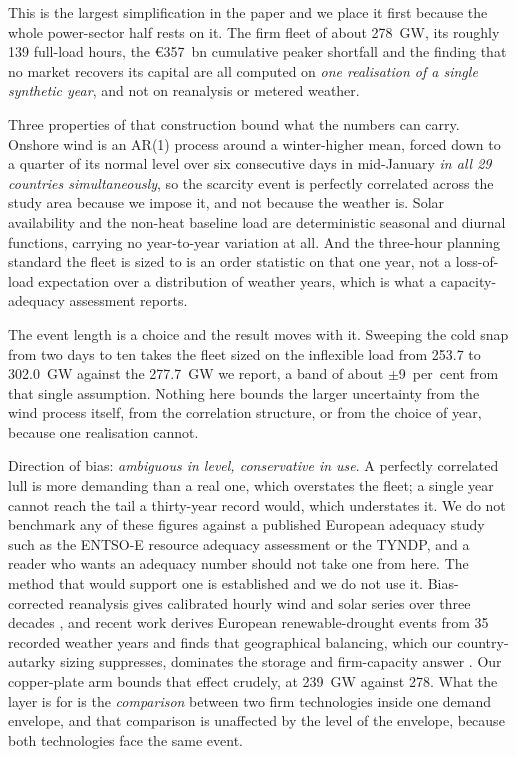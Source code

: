 This is the largest simplification in the paper and we place it first because the whole
power-sector half rests on it. The firm fleet of about 278~GW, its roughly 139 full-load
hours, the \euro{}357~bn cumulative peaker shortfall and the finding that no market
recovers its capital are all computed on \emph{one realisation of a single synthetic
year}, and not on reanalysis or metered weather.

Three properties of that construction bound what the numbers can carry. Onshore wind is an
AR(1) process around a winter-higher mean, forced down to a quarter of its normal level
over six consecutive days in mid-January \emph{in all 29 countries simultaneously}, so the
scarcity event is perfectly correlated across the study area because we impose it, and not
because the weather is. Solar availability and the non-heat baseline load are deterministic
seasonal and diurnal functions, carrying no year-to-year variation at all. And the
three-hour planning standard the fleet is sized to is an order statistic on that one
year, not a loss-of-load expectation over a distribution of weather years, which is what a
capacity-adequacy assessment reports.

The event length is a choice and the result moves with it. Sweeping the cold snap from two
days to ten takes the fleet sized on the inflexible load from 253.7 to 302.0~GW against the 277.7~GW we
report, a band of about $\pm$9~per~cent from that single assumption. Nothing here bounds
the larger uncertainty from the wind process itself, from the correlation structure, or
from the choice of year, because one realisation cannot.

Direction of bias: \emph{ambiguous in level, conservative in use}. A perfectly correlated
lull is more demanding than a real one, which overstates the fleet; a single year cannot
reach the tail a thirty-year record would, which understates it. We do not benchmark any of these figures against a published European adequacy study such as the ENTSO-E resource adequacy assessment or the TYNDP, and a reader who wants an adequacy number should not take one from here. The method that would support one is established and we do not use it. Bias-corrected reanalysis gives calibrated hourly wind and solar series over three decades \citep{Staffell2016Wind,Pfenninger2016Solar}, and recent work derives European renewable-drought events from 35 recorded weather years and finds that geographical balancing, which our country-autarky sizing suppresses, dominates the storage and firm-capacity answer \citep{Kittel2026Dunkelflaute}. Our copper-plate arm bounds that effect crudely, at 239~GW against 278. What the layer is for is the \emph{comparison} between two firm technologies
inside one demand envelope, and that comparison is unaffected by the level of the envelope,
because both technologies face the same event.

